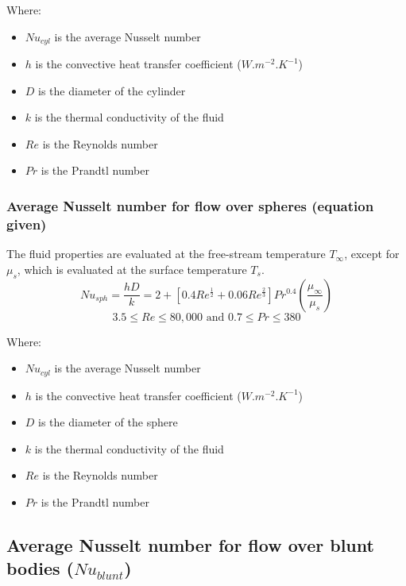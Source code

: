 \documentclass[11pt]{article}
\begin{document}
Where:
\begin{itemize}
\item \(Nu_{cyl}\) is the average Nusselt number
\item \(h\) is the convective heat transfer coefficient (\(\unit{W.m^{-2}.K^{-1}}\))
\item \(D\) is the diameter of the cylinder
\item \(k\) is the thermal conductivity of the fluid
\item \(Re\) is the Reynolds number
\item \(Pr\) is the Prandtl number
\end{itemize}
\subsubsection{Average Nusselt number for flow over spheres (equation given)}
\label{sec:org73f7554}
The fluid properties are evaluated at the free-stream temperature \(T_{\infty}\), except for \(\mu_s\), which is evaluated at the surface temperature \(T_s\).
\[Nu_{sph} = \frac{hD}{k} = 2 + \left[0.4 Re^{\frac{1}{2}} + 0.06 Re^{\frac{2}{3}} \right] Pr^{0.4} \left(\frac{\mu_{\infty}}{\mu_s} \right)\]
\[3.5 \le Re \le 80,000 \text{ and } 0.7 \le Pr \le 380\]

Where:
\begin{itemize}
\item \(Nu_{cyl}\) is the average Nusselt number
\item \(h\) is the convective heat transfer coefficient (\(\unit{W.m^{-2}.K^{-1}}\))
\item \(D\) is the diameter of the sphere
\item \(k\) is the thermal conductivity of the fluid
\item \(Re\) is the Reynolds number
\item \(Pr\) is the Prandtl number
\end{itemize}
\subsection{Average Nusselt number for flow over blunt bodies (\(Nu_{blunt}\))}
\label{sec:orgd789852}
\end{document}
